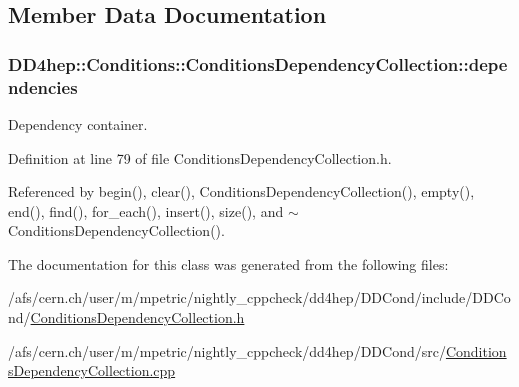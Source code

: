 \subsection{Member Data Documentation}
\hypertarget{class_d_d4hep_1_1_conditions_1_1_conditions_dependency_collection_aec9ef437ecf9857dbbda3f494be276b9}{
\subsubsection[{dependencies}]{ {\bf DD4hep::Conditions::ConditionsDependencyCollection::dependencies}}}
\label{class_d_d4hep_1_1_conditions_1_1_conditions_dependency_collection_aec9ef437ecf9857dbbda3f494be276b9}


Dependency container. 

Definition at line 79 of file ConditionsDependencyCollection.h.

Referenced by begin(), clear(), ConditionsDependencyCollection(), empty(), end(), find(), for\_\-each(), insert(), size(), and $\sim$ConditionsDependencyCollection().

The documentation for this class was generated from the following files:\begin{DoxyCompactItemize}
\item 
/afs/cern.ch/user/m/mpetric/nightly\_\-cppcheck/dd4hep/DDCond/include/DDCond/\hyperlink{_conditions_dependency_collection_8h}{ConditionsDependencyCollection.h}\item 
/afs/cern.ch/user/m/mpetric/nightly\_\-cppcheck/dd4hep/DDCond/src/\hyperlink{_conditions_dependency_collection_8cpp}{ConditionsDependencyCollection.cpp}\end{DoxyCompactItemize}
